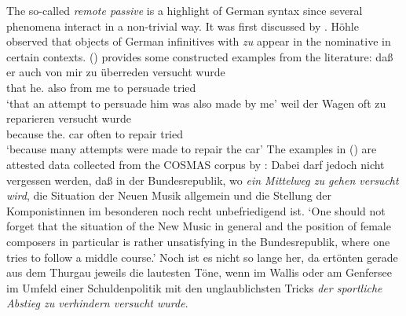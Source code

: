 \largerpage
The so-called \emph{remote passive} is a highlight of German syntax since several
phenomena interact in a non-trivial way. It was first discussed by \citet[--176]{Hoehle78a}. Höhle observed that objects of German infinitives with \emph{zu} appear in the
nominative in certain contexts. () provides some constructed examples from the literature:
\eal
\ex{}
\gll daß  er        auch von  mir zu überreden versucht wurde\footnotemark\\
     that he.\NOM{} also from me  to persuade  tried    \AUX\\\german
{}
\glt `that an attempt to persuade him was also made by me'
\ex 
\gll weil    der        Wagen oft   zu reparieren versucht wurde\\
     because the.\NOM{} car   often to repair     tried    \AUX\\
\glt `because many attempts were made to repair the car'\label{bsp-zu-reparieren-versucht-wurde}
\zl
The examples in () are attested data collected from the COSMAS corpus by \citet[--137]{Mueller2002b}:
\eal
\ex Dabei darf jedoch nicht vergessen werden, daß in der Bundesrepublik, wo \emph{ein Mittelweg zu gehen versucht wird}, 
die Situation der Neuen Musik allgemein und die Stellung der Komponistinnen im besonderen noch recht unbefriedigend ist.\footnotemark
%
\glt `One should not forget that the situation of the New Music in general and the position of female composers 
in particular is rather unsatisfying in the Bundesrepublik, where one tries to follow a middle course.'
\ex Noch ist es nicht so lange her, da ertönten gerade aus dem Thurgau jeweils die lautesten Töne, 
    wenn im Wallis oder am Genfersee im Umfeld einer Schuldenpolitik mit den unglaublichsten Tricks 
    \emph{der sportliche Abstieg zu verhindern versucht wurde}.\footnotemark
%
